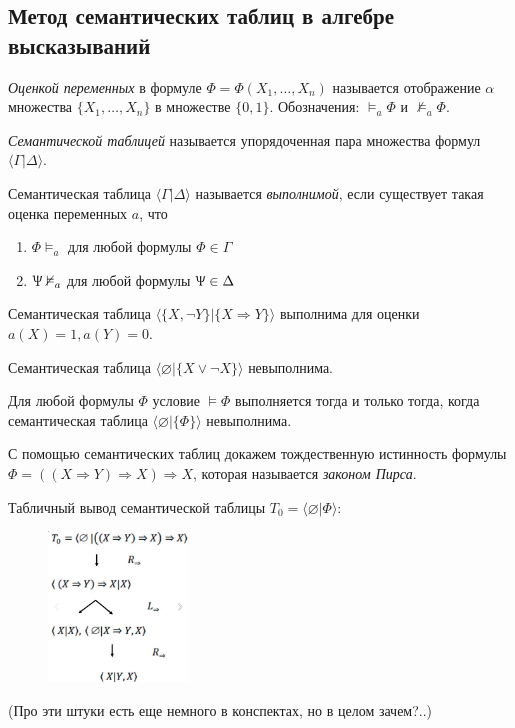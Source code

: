 \subsection*{Метод семантических таблиц в алгебре высказываний}
\begin{definition}
    \textit{Оценкой переменных} в формуле $\Phi = \Phi(X_1,\ldots,X_n)$ называется отображение $\alpha$ множества $\{X_1,\ldots,X_n\}$ в множестве $\{0,1\}$.
    Обозначения: $\models_a\Phi$ и $\nvDash_a \Phi$.
\end{definition}
\begin{definition}
    \textit{Семантической таблицей} называется упорядоченная пара множества формул $\langle\Gamma |\Delta  \rangle $.

    Семантическая таблица $\langle\Gamma |\Delta  \rangle $ называется \textit{выполнимой}, если существует такая оценка переменных $a$, что
    \begin{enumerate}
        \item $\Phi\models_a$ для любой формулы $\Phi \in \Gamma$
        \item $\Uppsi\nvDash_a$ для любой формулы $\Uppsi\in\Delta$
    \end{enumerate}
\end{definition}

\begin{example}
    Семантическая таблица $\langle \{X,\lnot Y\} | \{X\Rightarrow Y\} \rangle $ выполнима для оценки $a(X) = 1, a(Y) = 0$.
\end{example}

\begin{example}
    Семантическая таблица $\langle \varnothing | \{X \lor\lnot X\} \rangle $ невыполнима.
\end{example}

\begin{theorem}
    Для любой формулы $\Phi$ условие $\models \Phi$ выполняется тогда и только тогда, когда семантическая таблица $\langle \varnothing | \{\Phi\} \rangle $ невыполнима.
\end{theorem}

\begin{example}
    С помощью семантических таблиц докажем тождественную истинность формулы $\Phi = ((X\Rightarrow Y)\Rightarrow X)\Rightarrow X$, которая называется \textit{законом Пирса}.
\end{example}

Табличный вывод семантической таблицы $T_0 = \langle \varnothing | \Phi \rangle $:
\begin{figure}[H]
    \centering
    \includegraphics[height = 4cm]{images/pirse.png}
\end{figure}

(Про эти штуки есть еще немного в конспектах, но в целом зачем?..)
